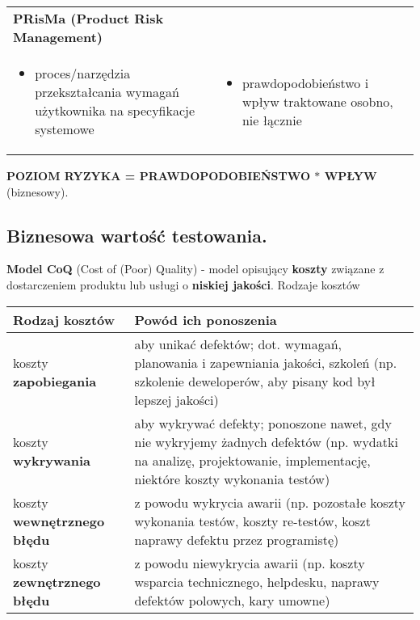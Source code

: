 \documentclass[../main.tex]{subfiles}
\begin{document}
\begin{table}[H]
\begin{center}
\begin{tabular}{| p{8cm} | p{8cm} |}
                \textbf{PRisMa (Product Risk Management)}\\
                \begin{itemize}
                    \item proces/narzędzia przekształcania wymagań użytkownika na specyfikacje systemowe
                \end{itemize}
                &
                \begin{itemize}
                    \item prawdopodobieństwo i wpływ traktowane osobno, nie łącznie
                \end{itemize}
                \\
                \hline
            \end{tabular}
        \end{center}
    \end{table}

    \textbf{POZIOM RYZYKA = PRAWDOPODOBIEŃSTWO $*$ WPŁYW}  (biznesowy).



    \subsection{Biznesowa wartość testowania.}

    \textbf{Model CoQ} (Cost of (Poor) Quality) - model opisujący \textbf{koszty} związane z dostarczeniem
    produktu lub usługi o \textbf{niskiej jakości}.
    Rodzaje kosztów

    \begin{table}[H]
        \begin{center}
            \begin{tabular}{| p{5cm} || p{11cm} |}
                \hline
                \textbf{Rodzaj kosztów} & \textbf{Powód ich ponoszenia}\\
                \hline
                \hline
                koszty \textbf{zapobiegania} & aby unikać defektów; dot. wymagań, planowania i zapewniania jakości, szkoleń (np. szkolenie deweloperów, aby pisany kod był lepszej jakości)\\
                \hline
                koszty \textbf{wykrywania} & aby wykrywać defekty; ponoszone nawet, gdy nie wykryjemy żadnych defektów (np. wydatki na analizę, projektowanie, implementację, niektóre koszty wykonania testów)\\
                \hline
                koszty \textbf{wewnętrznego błędu} & z powodu wykrycia awarii (np. pozostałe koszty wykonania testów, koszty re-testów, koszt naprawy defektu przez programistę)\\
                \hline
                koszty \textbf{zewnętrznego błędu} & z powodu niewykrycia awarii (np. koszty wsparcia technicznego, helpdesku, naprawy defektów polowych, kary umowne)\\
                \hline
            \end{tabular}
        \end{center}
    \end{table}
\end{document}
